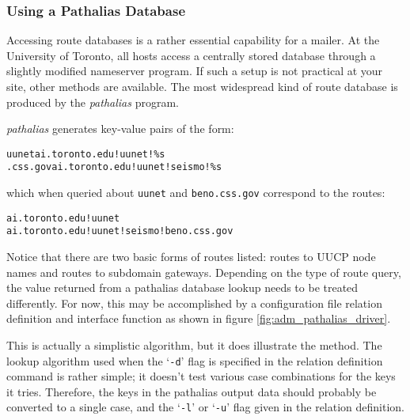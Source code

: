\subsubsection{Using a Pathalias Database}

Accessing route databases is a rather essential capability for a mailer.
At the University of Toronto, all hosts access a centrally stored database
through a slightly modified nameserver program.
If such a setup is not practical at your site, other methods are available.
The most widespread kind of route database is produced by the {\em pathalias}
program.

{\em pathalias} generates key-value pairs of the form:
\begin{alltt}\medskip
  uunet    ai.toronto.edu!uunet!\%s
  .css.gov ai.toronto.edu!uunet!seismo!\%s
\medskip\end{alltt}
which when queried about {\tt uunet} and {\tt beno.css.gov} correspond to 
the routes:
\begin{alltt}\medskip
  ai.toronto.edu!uunet
  ai.toronto.edu!uunet!seismo!beno.css.gov
\medskip\end{alltt}

Notice that there are two basic forms of routes listed: routes to UUCP node
names and routes to subdomain gateways.  Depending on the type of route
query, the value returned from a pathalias database lookup needs to be
treated differently.
For now, this may be accomplished by a configuration
file relation definition and interface function as shown in figure
\vref{fig:adm_pathalias_driver}.


This is actually a simplistic algorithm, but it does illustrate the method.
The lookup algorithm used when the `{\tt -d}' flag is specified in the
relation definition command is rather simple; it doesn't test various case
combinations for the keys it tries.  Therefore, the keys in the pathalias
output data should probably be converted to a single case, and the `{\tt -l}'
or `{\tt -u}' flag given in the relation definition.




